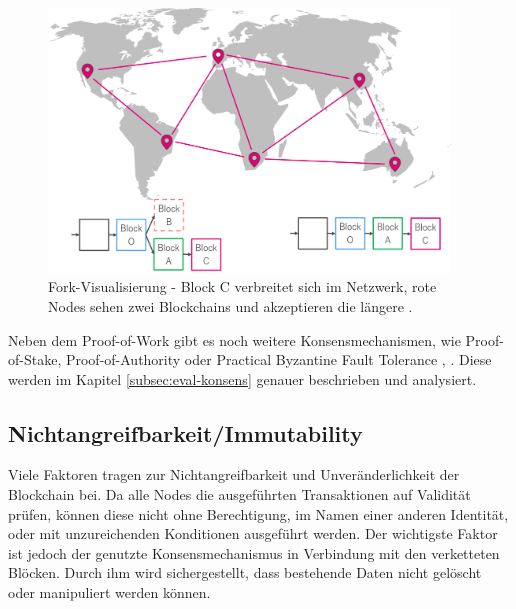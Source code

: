 \begin{figure}[htb]
  \centering
	\includegraphics[width=0.95\textwidth,angle=0]{images/fork_4}
 	\caption{Fork-Visualisierung - Block C verbreitet sich im Netzwerk, rote Nodes sehen zwei Blockchains und akzeptieren die längere \cite{AntonopoulosMasteringbitcoin2015}.}
	\label{fig:fork_4}
\end{figure}

Neben dem Proof-of-Work gibt es noch weitere Konsensmechanismen, wie Proof-of-Stake, Proof-of-Authority oder Practical Byzantine Fault Tolerance \cite{SukhwaniPerformanceModelingPBFT2017a}, \cite{DeAngelisPBFTvsproofofauthority2017} . Diese werden im Kapitel \ref{subsec:eval-konsens} genauer beschrieben und analysiert.

\label{subsec:immutability}
\subsection{Nichtangreifbarkeit/Immutability}
Viele Faktoren tragen zur Nichtangreifbarkeit und Unveränderlichkeit der Blockchain bei. Da alle Nodes die ausgeführten Transaktionen auf Validität prüfen, können diese nicht ohne Berechtigung, im Namen einer anderen Identität, oder mit unzureichenden Konditionen ausgeführt werden. Der wichtigste Faktor ist jedoch der genutzte Konsensmechanismus in Verbindung mit den verketteten Blöcken. Durch ihm wird sichergestellt, dass bestehende Daten nicht gelöscht oder manipuliert werden können.

